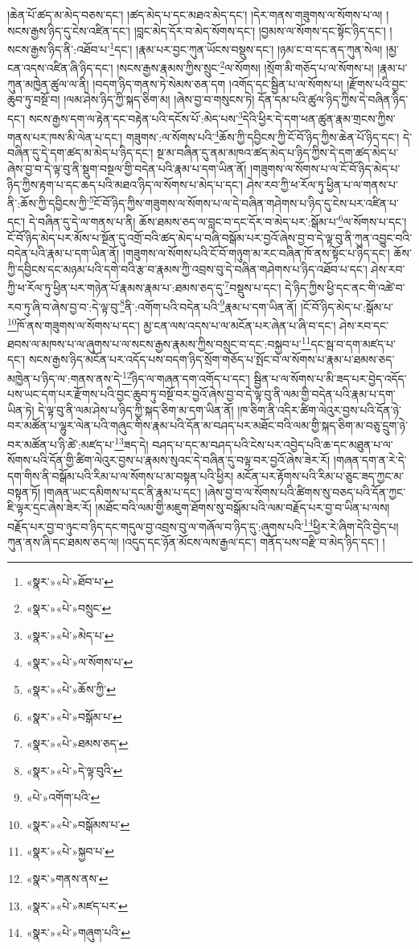 །ཆེན་པོ་ཚད་མ་མེད་བཅས་དང་། །ཚད་མེད་པ་དང་མཐའ་མེད་དང་། །དེར་གནས་གཟུགས་ལ་སོགས་པ་ལ། །སངས་རྒྱས་ཉིད་དུ་ངེས་འཛིན་དང་། །བླང་མེད་དོར་བ་མེད་སོགས་དང་། །བྱམས་ལ་སོགས་དང་སྟོང་ཉིད་དང་། །སངས་རྒྱས་ཉིད་ནི་:འཐོབ་པ་\footnote{«སྣར་»«པེ་»ཐོབ་པ་}དང་། །རྣམ་པར་བྱང་ཀུན་ཡོངས་བསྡུས་དང་། །ཉམ་ང་བ་དང་ནད་ཀུན་སེལ། །མྱ་ངན་འདས་འཛིན་ཞི་ཉིད་དང་། །སངས་རྒྱས་རྣམས་ཀྱིས་སྲུང་\footnote{«སྣར་»«པེ་»བསྲུང་}ལ་སོགས། །སྲོག་མི་གཅོད་པ་ལ་སོགས་པ། །རྣམ་པ་ཀུན་མཁྱེན་ཚུལ་ལ་ནི། །བདག་ཉིད་གནས་ཏེ་སེམས་ཅན་དག །འགོད་དང་སྦྱིན་པ་ལ་སོགས་པ། །རྫོགས་པའི་བྱང་ཆུབ་ཏུ་བསྔོ་བ། །ལམ་ཤེས་ཉིད་ཀྱི་སྐད་ཅིག་མ། །ཞེས་བྱ་བ་གསུངས་ཏེ། དོན་དམ་པའི་ཚུལ་ཉིད་ཀྱིས་དེ་བཞིན་ཉིད་དང་། སངས་རྒྱས་དག་ལ་རྟེན་དང་བརྟེན་པའི་དངོས་པོ་:མེད་པས་\footnote{«སྣར་»«པེ་»མེད་པ་}དེའི་ཕྱིར་དེ་དག་ཕན་ཚུན་རྣམ་གྲངས་ཀྱིས་གནས་པར་ཁས་མི་ལེན་པ་དང་། གཟུགས་:ལ་སོགས་པའི་\footnote{«སྣར་»«པེ་»ལ་སོགས་པ་}ཆོས་ཀྱི་དབྱིངས་ཀྱི་ངོ་བོ་ཉིད་ཀྱིས་ཆེན་པོ་ཉིད་དང་། དེ་བཞིན་དུ་དེ་དག་ཚད་མ་མེད་པ་ཉིད་དང་། སྔ་མ་བཞིན་དུ་ནམ་མཁའ་ཚད་མེད་པ་ཉིད་ཀྱིས་དེ་དག་ཚད་མེད་པ་ཞེས་བྱ་བ་དེ་ལྟ་བུ་ནི་སྡུག་བསྔལ་གྱི་བདེན་པའི་རྣམ་པ་དག་ཡིན་ནོ། །གཟུགས་ལ་སོགས་པ་ལ་ངོ་བོ་ཉིད་མེད་པ་ཉིད་ཀྱིས་རྟག་པ་དང་ཆད་པའི་མཐའ་ཉིད་ལ་སོགས་པ་མེད་པ་དང་། ཤེས་རབ་ཀྱི་ཕ་རོལ་ཏུ་ཕྱིན་པ་ལ་གནས་པ་ནི་:ཆོས་ཀྱི་དབྱིངས་ཀྱི་\footnote{«སྣར་»«པེ་»ཆོས་ཀྱི་}ངོ་བོ་ཉིད་ཀྱིས་གཟུགས་ལ་སོགས་པ་ལ་དེ་བཞིན་གཤེགས་པ་ཉིད་དུ་ངེས་པར་འཛིན་པ་དང་། དེ་བཞིན་དུ་དེ་ལ་གནས་པ་ནི། ཆོས་ཐམས་ཅད་ལ་བླང་བ་དང་དོར་བ་མེད་པར་:སྒོམ་པ་\footnote{«སྣར་»«པེ་»བསྒོམ་པ་}ལ་སོགས་པ་དང་། ངོ་བོ་ཉིད་མེད་པར་མོས་པ་སྔོན་དུ་འགྲོ་བའི་ཚད་མེད་པ་བཞི་བསྒོམ་པར་བྱའོ་ཞེས་བྱ་བ་དེ་ལྟ་བུ་ནི་ཀུན་འབྱུང་བའི་བདེན་པའི་རྣམ་པ་དག་ཡིན་ནོ། །གཟུགས་ལ་སོགས་པའི་ངོ་བོ་གཉུག་མ་རང་བཞིན་ཁོ་ནས་སྟོང་པ་ཉིད་དང་། ཆོས་ཀྱི་དབྱིངས་དང་མཉམ་པའི་དགེ་བའི་རྩ་བ་རྣམས་ཀྱི་འབྲས་བུ་དེ་བཞིན་གཤེགས་པ་ཉིད་འཐོབ་པ་དང་། ཤེས་རབ་ཀྱི་ཕ་རོལ་ཏུ་ཕྱིན་པར་གཉེན་པོ་རྣམས་རྣམ་པ་:ཐམས་ཅད་དུ་\footnote{«སྣར་»«པེ་»ཐམས་ཅད་}བསྡུས་པ་དང་། དེ་ཉིད་ཀྱིས་ཕྱི་དང་ནང་གི་འཚེ་བ་རབ་ཏུ་ཞི་བ་ཞེས་བྱ་བ་:དེ་ལྟ་བུ་\footnote{«སྣར་»«པེ་»དེ་ལྟ་བུའི་}ནི་:འགོག་པའི་བདེན་པའི་\footnote{«པེ་»འགོག་པའི་}རྣམ་པ་དག་ཡིན་ནོ། །ངོ་བོ་ཉིད་མེད་པ་:སྒོམ་པ་\footnote{«སྣར་»«པེ་»བསྒོམས་པ་}ཁོ་ནས་གཟུགས་ལ་སོགས་པ་དང་། མྱ་ངན་ལས་འདས་པ་ལ་མངོན་པར་ཞེན་པ་ཞི་བ་དང་། ཤེས་རབ་དང་ཐབས་ལ་མཁས་པ་ལ་ཞུགས་པ་ལ་སངས་རྒྱས་རྣམས་ཀྱིས་བསྲུང་བ་དང་:བསྐྱབ་པ་\footnote{«སྣར་»«པེ་»སྐྱབ་པ་}དང་སྦ་བ་དག་མཛད་པ་དང་། སངས་རྒྱས་ཉིད་མངོན་པར་འདོད་པས་བདག་ཉིད་སྲོག་གཅོད་པ་སྤོང་བ་ལ་སོགས་པ་རྣམ་པ་ཐམས་ཅད་མཁྱེན་པ་ཉིད་ལ་:གནས་ནས་དེ་\footnote{«སྣར་»གནས་ནས་}ཉིད་ལ་གཞན་དག་འགོད་པ་དང་། སྦྱིན་པ་ལ་སོགས་པ་མི་ཟད་པར་བྱེད་འདོད་པས་ཡང་དག་པར་རྫོགས་པའི་བྱང་ཆུབ་ཏུ་བསྔོ་བར་བྱའོ་ཞེས་བྱ་བ་དེ་ལྟ་བུ་ནི་ལམ་གྱི་བདེན་པའི་རྣམ་པ་དག་ཡིན་ཏེ། དེ་ལྟ་བུ་ནི་ལམ་ཤེས་པ་ཉིད་ཀྱི་སྐད་ཅིག་མ་དག་ཡིན་ནོ། །ཁ་ཅིག་ནི་འདིར་ཚིག་ལེའུར་བྱས་པའི་དོན་ཉེ་བར་མཚོན་པ་ལྷུར་ལེན་པའི་གཞུང་གིས་རྣམ་པའི་དོན་མ་བཤད་པར་མཐོང་བའི་ལམ་གྱི་སྐད་ཅིག་མ་བཅུ་དྲུག་ཉེ་བར་མཚོན་པ་ཉི་ཚེ་:མཛད་པ་\footnote{«སྣར་»«པེ་»མཛད་པར་}ཟད་དེ། བཤད་པ་དང་མ་བཤད་པའི་ངེས་པར་འབྱེད་པའི་ཆ་དང་མཐུན་པ་ལ་སོགས་པའི་དོན་གྱི་ཚིག་ལེའུར་བྱས་པ་རྣམས་སུའང་དེ་བཞིན་དུ་བལྟ་བར་བྱའོ་ཞེས་ཟེར་རོ། །གཞན་དག་ན་རེ་དེ་དག་གིས་ནི་བསྒོམ་པའི་རིམ་པ་ལ་སོགས་པ་མ་བསྟན་པའི་ཕྱིར། མངོན་པར་རྟོགས་པའི་རིམ་པ་ཅུང་ཟད་ཀྱང་མ་བསྟན་ཏོ། །གཞན་ཡང་དམིགས་པ་དང་ནི་རྣམ་པ་དང་། །ཞེས་བྱ་བ་ལ་སོགས་པའི་ཚིགས་སུ་བཅད་པའི་དོན་ཀྱང་ཇི་ལྟར་དྲང་ཞེས་ཟེར་རོ། །མཐོང་བའི་ལམ་གྱི་མཇུག་ཐོགས་སུ་བསྒོམ་པའི་ལམ་བརྗོད་པར་བྱ་བ་ཡིན་པ་ལས། བརྗོད་པར་བྱ་བ་ཉུང་བ་ཉིད་དང་གདུལ་བྱ་འབྲས་བུ་ལ་གཞོལ་བ་ཉིད་དུ་:ཞུགས་པའི་\footnote{«སྣར་»«པེ་»གཞུག་པའི་}ཕྱིར་རེ་ཞིག་དེའི་བྱེད་པ། ཀུན་ནས་ཞི་དང་ཐམས་ཅད་ལ། །འདུད་དང་ཉོན་མོངས་ལས་རྒྱལ་དང་། གནོད་པས་བརྫི་བ་མེད་ཉིད་དང་། །
